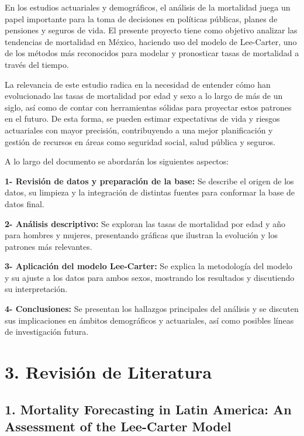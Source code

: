 \documentclass[
]{article}
\begin{document}
En los estudios actuariales y demográficos, el análisis de la mortalidad
juega un papel importante para la toma de decisiones en políticas
públicas, planes de pensiones y seguros de vida. El presente proyecto
tiene como objetivo analizar las tendencias de mortalidad en México,
haciendo uso del modelo de Lee-Carter, uno de los métodos más
reconocidos para modelar y pronosticar tasas de mortalidad a través del
tiempo.

La relevancia de este estudio radica en la necesidad de entender cómo
han evolucionado las tasas de mortalidad por edad y sexo a lo largo de
más de un siglo, así como de contar con herramientas sólidas para
proyectar estos patrones en el futuro. De esta forma, se pueden estimar
expectativas de vida y riesgos actuariales con mayor precisión,
contribuyendo a una mejor planificación y gestión de recursos en áreas
como seguridad social, salud pública y seguros.

A lo largo del documento se abordarán los siguientes aspectos:

\textbf{1- Revisión de datos y preparación de la base:} Se describe el
origen de los datos, su limpieza y la integración de distintas fuentes
para conformar la base de datos final.

\textbf{2- Análisis descriptivo:} Se exploran las tasas de mortalidad
por edad y año para hombres y mujeres, presentando gráficas que ilustran
la evolución y los patrones más relevantes.

\textbf{3- Aplicación del modelo Lee-Carter:} Se explica la metodología
del modelo y su ajuste a los datos para ambos sexos, mostrando los
resultados y discutiendo su interpretación.

\textbf{4- Conclusiones:} Se presentan los hallazgos principales del
análisis y se discuten sus implicaciones en ámbitos demográficos y
actuariales, así como posibles líneas de investigación futura.

\hypertarget{revisiuxf3n-de-literatura}{%
\section{3. Revisión de Literatura}\label{revisiuxf3n-de-literatura}}

\hypertarget{mortality-forecasting-in-latin-america-an-assessment-of-the-lee-carter-model}{%
\subsection{1. Mortality Forecasting in Latin America: An Assessment of
the Lee-Carter
Model}\label{mortality-forecasting-in-latin-america-an-assessment-of-the-lee-carter-model}}
\end{document}
